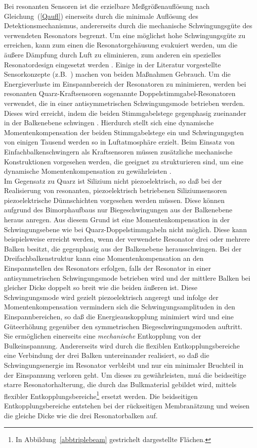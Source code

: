 Bei resonanten Sensoren ist die erzielbare Meßgrößenauflösung nach
Gleichung~(\ref{Qaufl}) einerseits durch die minimale Auflösung des
Detektionsmechanismus, andererseits durch die mechanische
Schwingungsgüte des verwendeten Resonators begrenzt. Um eine
möglichst hohe Schwingungsgüte zu erreichen, kann zum einen die
Resonatorgehäusung evakuiert werden, um die äußere Dämpfung durch Luft zu
eliminieren, zum anderen ein spezielles Resonatordesign eingesetzt werden
\cite{Ste91b}. Einige in der Literatur vorgestellte Sensorkonzepte
(z.B.\ \cite{Ike90b})
machen von beiden Maßnahmen Gebrauch. Um die Energieverluste im
Einspannbereich der Resonatoren zu minimieren, werden bei resonanten
Quarz-Kraftsensoren sogenannte Doppelstimmgabel-Resonatoren verwendet, die
in einer antisymmetrischen Schwingungsmode betrieben werden. Dieses wird
erreicht, indem die beiden Stimmgabelstege gegenphasig zueinander in der
Balkenebene schwingen \cite{Eer88}. Hierdurch stellt sich eine dynamische
Momentenkompensation der beiden Stimmgabelstege ein und Schwingungsgten
von einigen Tausend werden so in Luftatmosphäre erzielt.
Beim Einsatz von Einfachbalkenschwingern als Kraftsensoren müssen
zusätzliche mechanische Konstruktionen
vorgesehen werden, die geeignet zu strukturieren sind, um eine dynamische
Momentenkompensation zu gewährleisten \cite{Alb88}.\\
%
Im Gegensatz zu Quarz ist Silizium nicht piezoelektrisch, so daß bei der
Realisierung von resonanten, piezoelektrisch betriebenen Siliziumsensoren
piezoelektrische Dünnschichten vorgesehen werden müssen. Diese können
aufgrund des Bimorphaufbaus nur Biegeschwingungen aus der Balkenebene
heraus anregen. Aus diesem Grund ist eine Momentenkompensation in der
Schwingungsebene wie bei Quarz-Doppelstimmgabeln nicht möglich.
Diese kann beispielsweise erreicht werden, wenn der verwendete Resonator
drei \cite{Kir83,Sat89} oder mehrere Balken \cite{Til93} besitzt, die
gegenphasig aus der Balkenebene herausschwingen. Bei der
Dreifachbalkenstruktur kann eine Momentenkompensation an den Einspannstellen
des Resonators erfolgen, falls der Resonator in einer antisymmetrischen
Schwingungsmode betrieben wird und der mittlere Balken bei gleicher Dicke
doppelt so breit wie die beiden äußeren ist. Diese Schwingungsmode
wird gezielt piezoelektrisch angeregt und infolge der Momentenkompensation
vermindern sich die Schwingungsamplituden in den Einspannbereichen, so daß
die Energieauskopplung minimiert wird und eine Güteerhöhung gegenüber
den symmetrischen Biegeschwingungsmoden auftritt.
Sie ermöglichen einerseits eine {\em mechanische} Entkopplung von der
Bulkeinspannung. Andererseits wird durch die flexiblen Entkopplungsbereiche
eine Verbindung der drei Balken untereinander realisiert, so daß die
Schwingungsenergie im Resonator verbleibt und nur ein minimaler Bruchteil
in der Einspannung verloren geht. Um dieses zu gewährleisten,
muá die beidseitige starre Resonatorhalterung, die durch das Bulkmaterial
gebildet wird, mittels flexibler Entkopplungsbereiche\footnote{In
Abbildung~\ref{abbtriplebeam} gestrichelt dargestellte Flächen.} ersetzt
werden. Die beidseitigen Entkopplungsbereiche entstehen bei der rückseitigen
Membranätzung und weisen die gleiche Dicke wie die drei Resonatorbalken auf.




